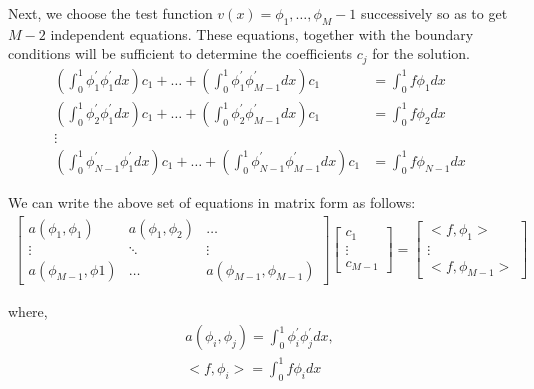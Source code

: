 \documentclass{article}
\begin{document}
Next, we choose the test function $v(x) = \phi_1, \hdots, \phi_M-1$ successively so as to get $M-2$ independent equations. These equations, together with the boundary conditions will be sufficient to determine the coefficients $c_j$ for the solution.
\begin{align}
    \left( \int_0^1 \phi_1^{'}\phi_1^{'}dx\right)c_1 + \hdots + \left( \int_0^1 \phi_1^{'}\phi_{M-1}^{'}dx \right)c_1 &= \int_0^1 f\phi_1dx     \\
    \left( \int_0^1 \phi_2^{'}\phi_1^{'}dx\right)c_1 + \hdots + \left( \int_0^1 \phi_2^{'}\phi_{M-1}^{'}dx \right)c_1 &= \int_0^1 f\phi_2dx     \\
    \vdots  \\
    \left( \int_0^1 \phi_{N-1}^{'}\phi_1^{'}dx\right)c_1 + \hdots + \left( \int_0^1 \phi_{N-1}^{'}\phi_{M-1}^{'}dx \right)c_1 &= \int_0^1 f\phi_{N-1}dx
\end{align}

We can write the above set of equations in matrix form as follows:
\begin{align}
    \begin{bmatrix}
        a(\phi_1,\phi_1) & a(\phi_1,\phi_2) & \hdots \\
        \vdots      &   \ddots      &       \vdots \\
        a(\phi_{M-1},\phi1) & \hdots    & a(\phi_{M-1},\phi_{M-1})
    \end{bmatrix}
    \begin{bmatrix}
        c_1 \\
        \vdots \\
        c_{M-1}
    \end{bmatrix}
    =
    \begin{bmatrix}
        <f,\phi_1> \\
        \vdots \\
        <f,\phi_{M-1}>
    \end{bmatrix}
\end{align}

where,
\begin{align}
    a(\phi_i,\phi_j) = \int_0^1 \phi_i^{'}\phi_j^{'}dx, \\
    <f,\phi_i> = \int_0^1 f\phi_i dx
\end{align}
\end{document}

